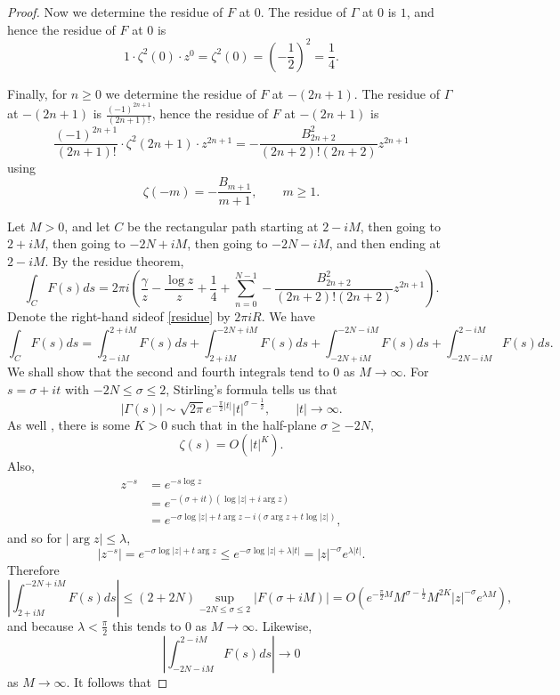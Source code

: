 \documentclass{article}
\begin{document}
\begin{proof}
Now we determine the residue of $F$ at $0$. The residue of $\Gamma$ at $0$ is $1$, and 
hence the residue of $F$ at $0$ is 
\[
1 \cdot \zeta^2(0) \cdot z^0 = \zeta^2(0) = \left( -\frac{1}{2} \right)^2 = \frac{1}{4}.
\]

Finally, for $n \geq 0$ we determine the residue of $F$ at $-(2n+1)$. The residue of $\Gamma$ at $-(2n+1)$ is
$\frac{(-1)^{2n+1}}{(2n+1)!}$, hence the residue of $F$ at $-(2n+1)$ is
\[
\frac{(-1)^{2n+1}}{(2n+1)!} \cdot \zeta^2(2n+1) \cdot z^{2n+1} = 
-\frac{B_{2n+2}^2}{(2n+2)!(2n+2)} z^{2n+1}
\]  
using 
\[
\zeta(-m) = -\frac{B_{m+1}}{m+1}, \qquad m \geq 1.
\]


Let $M>0$,
and let $C$ be the rectangular path  starting at $2-iM$, then going to $2+iM$, then going to $-2N+iM$,  then going to $-2N-iM$, and then ending 
at $2-iM$. 
By the residue theorem,
\begin{equation}
\int_C F(s) ds = 2\pi i\left(\frac{\gamma}{z}-\frac{\log z}{z}+\frac{1}{4} + \sum_{n=0}^{N-1}  -\frac{B_{2n+2}^2}{(2n+2)!(2n+2)} z^{2n+1}
\right).
\label{residue}
\end{equation}
Denote the right-hand sideof \eqref{residue}  by $2\pi i R$.
We have
\[
\int_C F(s) ds = 
\int_{2-iM}^{2+iM} F(s) ds + \int_{2+iM}^{-2N+iM} F(s) ds
+ \int_{-2N+iM}^{-2N-iM} F(s) ds +
\int_{-2N-iM}^{2-iM} F(s) ds.
\]
We shall show that the second and fourth integrals tend to $0$ as $M \to \infty$.
For $s=\sigma+it$ with $-2N \leq \sigma \leq 2$, Stirling's formula \cite[p.~151]{titchmarsh}  tells us that
\[
|\Gamma(s)| \sim \sqrt{2\pi} e^{-\frac{\pi}{2} |t|} |t|^{\sigma-\frac{1}{2}}, \qquad |t| \to \infty.
\]
As well \cite[p.~95]{zeta},
there is some $K>0$  such that in the half-plane $\sigma \geq -2N$,
\[
\zeta(s)=O(|t|^K).
\]
Also,
\begin{align*}
z^{-s} &= e^{-s \log z}\\
& = e^{-(\sigma+it)(\log |z|+i\arg z)} \\
&= e^{-\sigma \log|z| + t \arg z - i(\sigma \arg z+t \log|z|)},
\end{align*}
and so for $|\arg z| \leq \lambda$,
\[
|z^{-s}| = e^{-\sigma \log|z| + t \arg z}  \leq e^{-\sigma \log |z|+\lambda |t|} = |z|^{-\sigma} e^{\lambda |t|}.
\]
Therefore
\[
\left| \int_{2+iM}^{-2N+iM} F(s) ds \right| 
\leq (2+2N) \sup_{-2N \leq \sigma \leq 2} |F(\sigma+iM)|
=O(e^{-\frac{\pi}{2} M} M^{\sigma-\frac{1}{2}} M^{2K}  |z|^{-\sigma} e^{\lambda M}),
\]
and because $\lambda<\frac{\pi}{2}$ this tends to $0$ as $M \to \infty$.
Likewise,
\[
\left|\int_{-2N-iM}^{2-iM} F(s) ds \right| \to 0
\]
as $M \to \infty$. It follows that

\end{proof}
\end{document}
